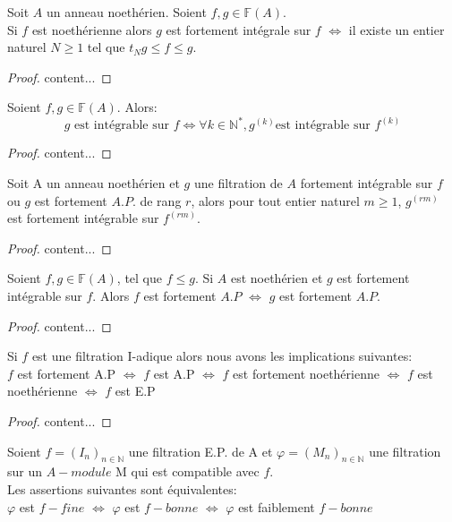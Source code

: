 \begin{maproposition}
	Soit $A$ un anneau noethérien. Soient $f,g \in \mathbb{F}(A)$.\\ Si $f$ est noethérienne alors $g$ est fortement intégrale sur $f$ $\Longleftrightarrow$ il existe un entier naturel $N \geqslant 1$ tel que $t_{N}g \leqslant f \leqslant g$.
\end{maproposition}
\begin{proof}
	content...
\end{proof}
\begin{maproposition}
	Soient $f,g \in \mathbb{F}(A)$. Alors:
	\[ g \text{ est intégrable sur } f \Longleftrightarrow \forall k \in \mathbb{N}^{*}, g^{(k)} \text{est intégrable sur } f^{(k)} \]
\end{maproposition}
\begin{proof}
	content...
\end{proof}
\begin{maproposition}
	Soit A un anneau noethérien et $g$ une filtration de $A$ fortement intégrable sur $f$ ou $g$ est fortement $A.P.$ de rang $r$, alors pour tout entier naturel $m \geqslant 1$, $g^{(rm)}$ est fortement intégrable sur $f^{(rm)}$.  
\end{maproposition}
\begin{proof}
	content...
\end{proof}
\begin{moncorollaire}
	Soient $f,g \in \mathbb{F}(A)$, tel que $f \leqslant g$. Si $A$ est noethérien et $g$ est fortement intégrable sur $f$. Alors $f$ est fortement $A.P$ $\Longleftrightarrow$ $g$ est fortement $A.P.$
\end{moncorollaire}
\begin{proof}
	content...
\end{proof}
\begin{maproposition}
	Si $f$ est une filtration I-adique alors nous avons les implications suivantes:\\
	$f$ est fortement A.P $\Longleftrightarrow $ $f$ est A.P $\Longleftrightarrow $ $f$ est fortement noethérienne $\Longleftrightarrow $ $f$ est noethérienne $\Longleftrightarrow $ $f$ est E.P
\end{maproposition}
\begin{proof}
	content...
\end{proof}
\begin{maproposition}
	Soient $f=(I_n)_{n \in \mathbb{N}}$ une filtration E.P. de A et $\varphi=(M_n)_{n \in \mathbb{N}}$ une filtration sur un $A-module$ M qui est compatible avec $f$.\\
	Les assertions suivantes sont équivalentes:\\
	$\varphi$ est $f-fine$ $\Longleftrightarrow $ $\varphi$ est $f-bonne$ $\Longleftrightarrow $ $\varphi$ est faiblement $f-bonne$
\end{maproposition}
